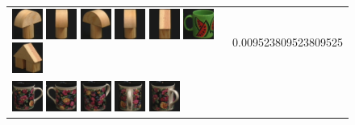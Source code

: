\begin{figure}[tbp]
\begin{center}
\begin{tabular}{m{11cm} | m{3cm} |}
\includegraphics[width=1cm]{coil/beeld-3.eps}
\includegraphics[width=1cm]{coil/beeld-5.eps}
\includegraphics[width=1cm]{coil/beeld-4.eps}
\includegraphics[width=1cm]{coil/beeld-2.eps}
\includegraphics[width=1cm]{coil/beeld-47.eps}
\includegraphics[width=1cm]{coil/beeld-31.eps}
\includegraphics[width=1cm]{coil/beeld-46.eps}
& {\scriptsize 0.009523809523809525}
\\
\includegraphics[width=1cm]{coil/beeld-60.eps}
\includegraphics[width=1cm]{coil/beeld-61.eps}
\includegraphics[width=1cm]{coil/beeld-63.eps}
\includegraphics[width=1cm]{coil/beeld-65.eps}
\includegraphics[width=1cm]{coil/beeld-64.eps}

\end{tabular}
\end{center}
\end{figure}

